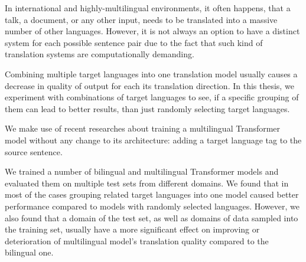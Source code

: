 \documentclass[12pt]{report}
\begin{document}

In international and highly-multilingual environments,
it often happens, that a talk, a document, or any other
input, needs to be translated into a massive number of other languages.
However, it is not always an option to have a distinct system for each
possible sentence pair due to the fact that such kind of translation
systems are computationally demanding.

Combining multiple target languages into one translation model usually
causes a decrease in quality of output for each its translation
direction.
In this thesis, we experiment with combinations of target languages
to see, if a specific grouping of them can lead to better results,
than just randomly selecting target languages.

We make use of recent researches about training a multilingual
Transformer model without any change to its architecture:
adding a target language tag to the source sentence.

We trained a number of bilingual and multilingual
Transformer models and evaluated them on multiple test sets
from different domains.
We found that in most of the cases grouping related
target languages into one model caused better performance
compared to models with randomly selected languages.
However, we also found that a domain of the test set,
as well as domains of data sampled into the training set,
usually have a more significant effect on improving or
deterioration of multilingual model's translation quality
compared to the bilingual one.
\end{document}
